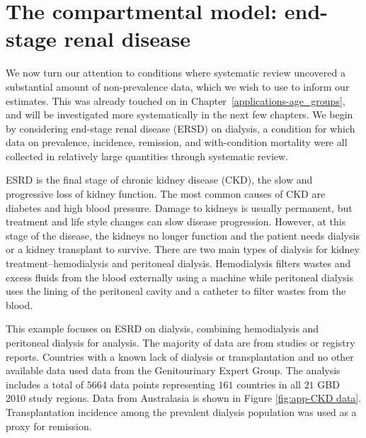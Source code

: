 \chapter{The compartmental model: end-stage renal disease}
\label{applications-fits_incon_v_con}

We now turn our attention to conditions where systematic review
uncovered a substantial amount of non-prevalence data, which we wish
to use to inform our estimates.  This was already touched on in
Chapter~\ref{applications-age_groups}, and will be investigated more
systematically in the next few chapters.  We begin by considering
end-stage renal disease (ERSD) on dialysis, a condition for which data on
prevalence, incidence, remission, and with-condition mortality were
all collected in relatively large quantities through systematic
review.

ESRD is the final stage of chronic kidney disease (CKD), the slow and
progressive loss of kidney function.  The most common causes of CKD 
are diabetes and high blood pressure.  Damage to kidneys is usually 
permanent, but treatment and life style changes can slow disease progression.  However, at this stage of the disease, the kidneys no longer function 
and the patient needs dialysis or a kidney transplant to survive.  
There are two main types of
dialysis for kidney treatment--hemodialysis and peritoneal dialysis.
Hemodialysis filters wastes and excess fluids from the blood
externally using a machine while peritoneal dialysis uses the lining
of the peritoneal cavity and a catheter to filter wastes from the
blood. \cite{_k/doqi_2002, dipiro_pharmacotherapy:_2008}

This example focuses on ESRD on dialysis, combining hemodialysis 
and peritoneal dialysis for analysis.
The majority of data are from studies or registry reports.  Countries with
a known lack of dialysis or transplantation and no other available data
used data from the Genitourinary Expert Group.  The analysis
includes a total of $5664$ data points representing $161$ countries in
all $21$ GBD 2010 study regions.  Data from Australasia is shown in
Figure \ref{fig:app-CKD data}.
Transplantation incidence among the prevalent
dialysis population was used as a proxy for remission.  


